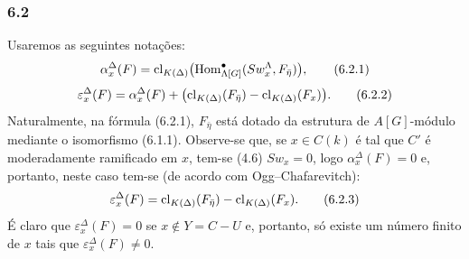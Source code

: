 \subsubsection*{6.2}

Usaremos as seguintes notações:
\[
\alpha_x^\Delta(F)
=
\operatorname{cl}_{K(\Delta)}\bigl(\operatorname{Hom}^\bullet_{\Lambda[G]}(Sw_x^\Lambda,F_{\bar\eta})\bigr),
\tag{6.2.1}
\]
\[
\varepsilon_x^\Delta(F)
=
\alpha_x^\Delta(F)+
\bigl(\operatorname{cl}_{K(\Delta)}(F_{\bar\eta})-\operatorname{cl}_{K(\Delta)}(F_x)\bigr).
\tag{6.2.2}
\]
Naturalmente, na fórmula (6.2.1), $F_{\bar\eta}$ está dotado da estrutura de $A[G]$-módulo mediante o isomorfismo (6.1.1). Observe-se que, se $x\in C(k)$ é tal que $C'$ é moderadamente ramificado em $x$, tem-se (4.6) $Sw_x=0$, logo $\alpha_x^\Delta(F)=0$ e, portanto, neste caso tem-se (de acordo com Ogg--Chafarevitch):
\[
\varepsilon_x^\Delta(F)=\operatorname{cl}_{K(\Delta)}(F_{\bar\eta})-\operatorname{cl}_{K(\Delta)}(F_x).
\tag{6.2.3}
\]
É claro que $\varepsilon_x^\Delta(F)=0$ se $x\notin Y=C-U$ e, portanto, só existe um número finito de $x$ tais que $\varepsilon_x^\Delta(F)\ne0$.
